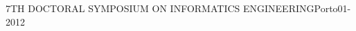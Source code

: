 

\begin{cventries}
  \cventry
{}{7TH DOCTORAL SYMPOSIUM ON INFORMATICS ENGINEERING}{Porto}{01-2012}
{}\end{cventries}
